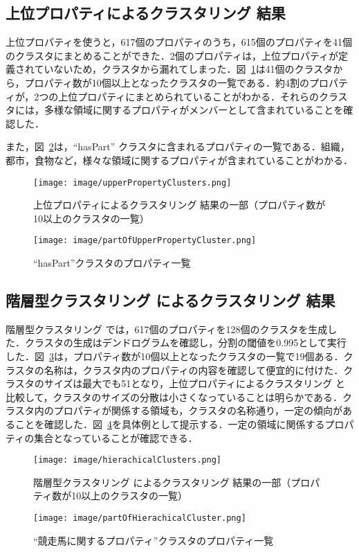 \subsection{上位プロパティによるクラスタリング 結果}
\label{sec:upperPropertyClusteringResult}
上位プロパティを使うと，617個のプロパティのうち，615個のプロパティを41個のクラスタにまとめることができた．2個のプロパティは，上位プロパティが定義されていないため，クラスタから漏れてしまった．図~\ref{fig:upperPropertyClusters}は41個のクラスタから，プロパティ数が10個以上となったクラスタの一覧である．約4割のプロパティが，2つの上位プロパティにまとめられていることがわかる．それらのクラスタには，多様な領域に関するプロパティがメンバーとして含まれていることを確認した．

また，図~\ref{fig:partOfUpperPropertyCluster}は，``hasPart'' クラスタに含まれるプロパティの一覧である．組織，都市，食物など，様々な領域に関するプロパティが含まれていることがわかる．
%
\begin{figure}[h]
\centering
\texttt{[image: image/upperPropertyClusters.png]}
\caption{\small
上位プロパティによるクラスタリング 結果の一部（プロパティ数が10以上のクラスタの一覧）
}
\label{fig:upperPropertyClusters}
\end{figure}
%
\begin{figure}[h]
\centering
\texttt{[image: image/partOfUpperPropertyCluster.png]}
\caption{\small
``hasPart''クラスタのプロパティ一覧
}
\label{fig:partOfUpperPropertyCluster}
\end{figure}
%
\subsection{階層型クラスタリング によるクラスタリング 結果}
\label{sec:hierachicalClustersResult}
階層型クラスタリング では，617個のプロパティを128個のクラスタを生成した．クラスタの生成はデンドログラムを確認し，分割の閾値を0.995として実行した．図~\ref{fig:hierachicalClusters}は，プロパティ数が10個以上となったクラスタの一覧で19個ある．クラスタの名称は，クラスタ内のプロパティの内容を確認して便宜的に付けた．クラスタのサイズは最大でも51となり，上位プロパティによるクラスタリング と比較して，クラスタのサイズの分散は小さくなっていることは明らかである．クラスタ内のプロパティが関係する領域も，クラスタの名称通り，一定の傾向があることを確認した．図~\ref{fig:partOfHierachicalCluster}を具体例として提示する．一定の領域に関係するプロパティの集合となっていることが確認できる．
%
\begin{figure}[h]
\centering
\texttt{[image: image/hierachicalClusters.png]}
\caption{\small
階層型クラスタリング によるクラスタリング 結果の一部（プロパティ数が10以上のクラスタの一覧）
}
\label{fig:hierachicalClusters}
\end{figure}
%
\begin{figure}[h]
\centering
\texttt{[image: image/partOfHierachicalCluster.png]}
\caption{\small
``競走馬に関するプロパティ''クラスタのプロパティ一覧
}
\label{fig:partOfHierachicalCluster}
\end{figure}
%
